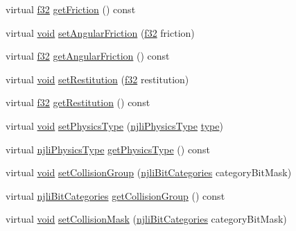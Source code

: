 \begin{DoxyCompactItemize}
virtual \mbox{\hyperlink{_util_8h_a5f6906312a689f27d70e9d086649d3fd}{f32}} \mbox{\hyperlink{classnjli_1_1_physics_body_a5140f2a2f0df419db4acfe85aa7ffc1c}{get\+Friction}} () const
\item 
virtual \mbox{\hyperlink{_thread_8h_af1e856da2e658414cb2456cb6f7ebc66}{void}} \mbox{\hyperlink{classnjli_1_1_physics_body_a9361f24aea1decf35d872e7509d4e9dc}{set\+Angular\+Friction}} (\mbox{\hyperlink{_util_8h_a5f6906312a689f27d70e9d086649d3fd}{f32}} friction)
\item 
virtual \mbox{\hyperlink{_util_8h_a5f6906312a689f27d70e9d086649d3fd}{f32}} \mbox{\hyperlink{classnjli_1_1_physics_body_aacb7f2a5e518977ee8db878286b86884}{get\+Angular\+Friction}} () const
\item 
virtual \mbox{\hyperlink{_thread_8h_af1e856da2e658414cb2456cb6f7ebc66}{void}} \mbox{\hyperlink{classnjli_1_1_physics_body_a9741d811656fcd2865d688627ee2ea8b}{set\+Restitution}} (\mbox{\hyperlink{_util_8h_a5f6906312a689f27d70e9d086649d3fd}{f32}} restitution)
\item 
virtual \mbox{\hyperlink{_util_8h_a5f6906312a689f27d70e9d086649d3fd}{f32}} \mbox{\hyperlink{classnjli_1_1_physics_body_a1b125030c9a2abf3c450ef4e1dc492c3}{get\+Restitution}} () const
\item 
virtual \mbox{\hyperlink{_thread_8h_af1e856da2e658414cb2456cb6f7ebc66}{void}} \mbox{\hyperlink{classnjli_1_1_physics_body_ae9b3b3115dbc70f21b5f5fb8c66aa18c}{set\+Physics\+Type}} (\mbox{\hyperlink{namespacenjli_a60ba626f4609f81870c92d042c6bc83d}{njli\+Physics\+Type}} \mbox{\hyperlink{classnjli_1_1_physics_body_a98036bcbea6e3269603a83e532d2e5ab}{type}})
\item 
virtual \mbox{\hyperlink{namespacenjli_a60ba626f4609f81870c92d042c6bc83d}{njli\+Physics\+Type}} \mbox{\hyperlink{classnjli_1_1_physics_body_aaed92388b5924746fbd38b87d3bc66b6}{get\+Physics\+Type}} () const
\item 
virtual \mbox{\hyperlink{_thread_8h_af1e856da2e658414cb2456cb6f7ebc66}{void}} \mbox{\hyperlink{classnjli_1_1_physics_body_aad9390d215723749aabf132dac31d455}{set\+Collision\+Group}} (\mbox{\hyperlink{namespacenjli_af7b302a2b48bb644f85c88080925c974}{njli\+Bit\+Categories}} category\+Bit\+Mask)
\item 
virtual \mbox{\hyperlink{namespacenjli_af7b302a2b48bb644f85c88080925c974}{njli\+Bit\+Categories}} \mbox{\hyperlink{classnjli_1_1_physics_body_a58fdc56103d9aa37f477d7a09d5a91ef}{get\+Collision\+Group}} () const
\item 
virtual \mbox{\hyperlink{_thread_8h_af1e856da2e658414cb2456cb6f7ebc66}{void}} \mbox{\hyperlink{classnjli_1_1_physics_body_a15550580fd04daffff4a9f777259fc4a}{set\+Collision\+Mask}} (\mbox{\hyperlink{namespacenjli_af7b302a2b48bb644f85c88080925c974}{njli\+Bit\+Categories}} category\+Bit\+Mask)

\end{DoxyCompactItemize}
